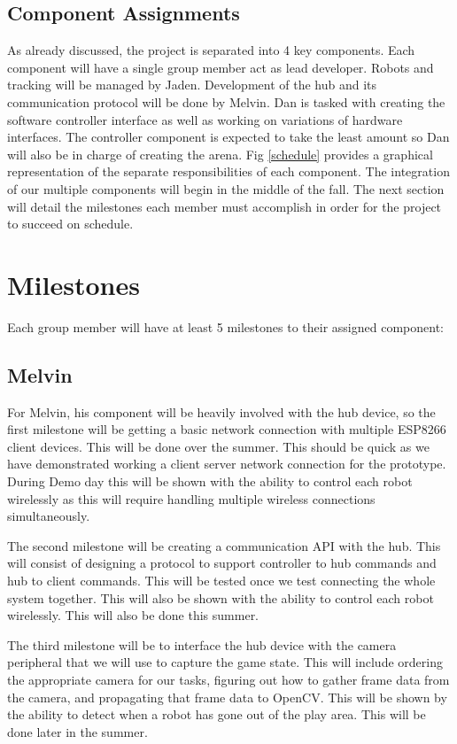 \documentclass[11pt]{ieeeconf}
\begin{document}
\subsection{Component Assignments}
As already discussed, the project is separated into 4 key components. Each component will have a single group member act as lead developer. Robots and tracking will be managed by Jaden. Development of the hub and its communication protocol will be done by Melvin. Dan is tasked with creating the software controller interface as well as working on variations of hardware interfaces. The controller component is expected to take the least amount so Dan will also be in charge of creating the arena. Fig \ref{schedule} provides a graphical representation of the separate responsibilities of each component. The integration of our multiple components will begin in the middle of the fall. The next section will detail the milestones each member must accomplish in order for the project to succeed on schedule.

\section{Milestones}
Each group member will have at least 5 milestones to their assigned component: 

\subsection{Melvin}
For Melvin, his component will be heavily involved with the hub device, so the first milestone will be getting a basic network connection with multiple ESP8266 client devices. This will be done over the summer. This should be quick as we have demonstrated working a client server network connection for the prototype. During Demo day this will be shown with the ability to control each robot wirelessly as this will require handling multiple wireless connections simultaneously.

The second milestone will be creating a communication API with the hub. This will consist of designing a protocol to support controller to hub commands and hub to client commands. This will be tested once we test connecting the whole system together. This will also be shown with the ability to control each robot wirelessly. This will also be done this summer.

The third milestone will be to interface the hub device with the camera peripheral that we will use to capture the game state. This will include ordering the appropriate camera for our tasks, figuring out how to gather frame data from the camera, and propagating that frame data to OpenCV. This will be shown by the ability to detect when a robot has gone out of the play area. This will be done later in the summer.
\end{document}
